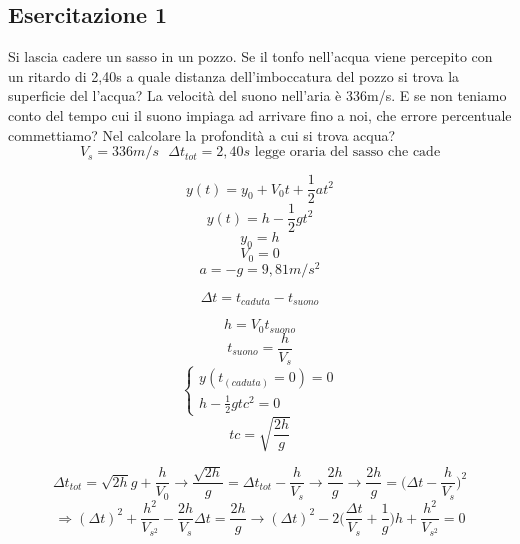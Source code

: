 \subsection{Esercitazione 1}
Si lascia cadere un sasso in un pozzo. Se il tonfo nell'acqua viene percepito
con un ritardo di 2,40s a quale distanza dell'imboccatura del pozzo si trova la
superficie del l'acqua? La velocità del suono nell'aria è 336m/s. E se non teniamo conto del tempo cui il suono impiaga ad arrivare fino a noi, che errore percentuale commettiamo? Nel calcolare la profondità a cui si trova acqua?
\begin{equation*}
	V_{s}=336m/s\text{ } \Delta t_{tot}=2,40s \text{ legge oraria del sasso che cade}
\end{equation*}
\begin{multicols}{2}
	\begin{equation*}
		y(t)=y_0+V_0t+\frac{1}{2}at^2
	\end{equation*}
	\begin{equation*}
		y(t)=h-\frac{1}{2}gt^2
	\end{equation*}
	\begin{equation*}
		y_0=h
	\end{equation*}
	\begin{equation*}
		V_0=0
	\end{equation*}
	\begin{equation*}
		a=-g=9,81m/s^2
	\end{equation*}
\end{multicols}
\begin{equation*}
	\Delta t=t_{caduta}-t_{suono}
\end{equation*}
\begin{multicols}{2}
	\begin{equation*}
		h=V_0t_{suono}
	\end{equation*}
	\begin{equation*}
		t_{suono}=\frac{h}{V_s}
	\end{equation*}
	\begin{equation*}
		\begin{cases}
			y(t_{(caduta)}=0)=0 \\
			h-\frac{1}{2}gtc^2=0
		\end{cases}
	\end{equation*}
	\begin{equation*}
		tc=\sqrt{\frac{2h}{g}}
	\end{equation*}
\end{multicols}
\begin{equation*}
	\Delta t_{tot}=\sqrt{2h}{g}+\frac{h}{V_0}\to \frac{\sqrt{2h}}{g}=\Delta t_{tot} - \frac{h}{V_s}\to \frac{2h}{g}\to \frac{2h}{g}=\bigg(\Delta t-\frac{h}{V_s}\bigg)^2
\end{equation*}
\begin{equation*}
	\Rightarrow (\Delta t)^2+\frac{h^2}{V_{s^2}} -\frac{2h}{V_s}\Delta t=\frac{2h}{g}\to (\Delta t)^2-2 \bigg(\frac{\Delta t}{V_s}+\frac{1}{g}\bigg) h+\frac{h^2}{V_{s^2}} =0 
\end{equation*}
